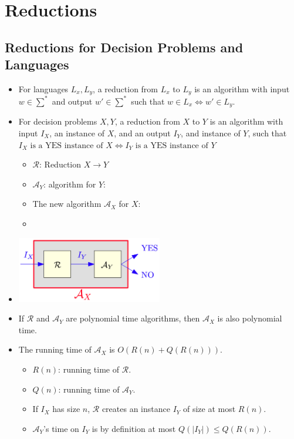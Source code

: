 \documentclass[12pt]{article}
\begin{document}
\section{Reductions}

\subsection{Reductions for Decision Problems and Languages}
\begin{itemize}
    \item For languages $L_x, L_y$, a reduction from $L_x$ to $L_y$ is an algorithm with input $w \in \sum^\ast$ and output $w' \in \sum^\ast$ such that $w \in L_x \iff w' \in L_y$.
    \item For decision problems $X, Y$, a reduction from $X$ to $Y$ is an algorithm with input $I_X$, an instance of $X$, and an output $I_Y$, and instance of $Y$, such that $I_X \text{ is a YES instance of } X \iff I_Y \text{ is a YES instance of } Y$
    \begin{itemize}
        \item $\mathcal{R}$: Reduction $X \rightarrow Y$
        \item $\mathcal{A}_Y$: algorithm for $Y$:
        \item The new algorithm $\mathcal{A}_X$ for $X$:
        \item[] 
    \end{itemize}
    \item[] \begin{center}
        \includegraphics[width=0.5\textwidth]{images/reduction.jpg}
    \end{center}
    \item If $\mathcal{R}$ and $\mathcal{A}_Y$ are polynomial time algorithms, then $\mathcal{A}_X$ is also polynomial time.
    \item The running time of $\mathcal{A}_X$ is $O(R(n) + Q(R(n)))$.
    \begin{itemize}
        \item $R(n)$: running time of $\mathcal{R}$.
        \item $Q(n)$: running time of $\mathcal{A}_Y$.
        \item If $I_X$ has size $n$, $\mathcal{R}$ creates an instance $I_Y$ of size at most $R(n)$.
        \item $\mathcal{A}_Y$'s time on $I_Y$ is by definition at most $Q(\left|I_Y\right|) \leq Q(R(n))$.
    \end{itemize}
\end{itemize}
\end{document}
